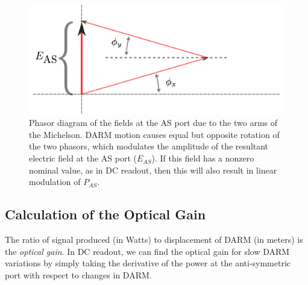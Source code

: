 \begin{figure}[p]
\includegraphics[width=\columnwidth]{figures/phasors.pdf}
\caption[Phasor diagram of DC readout]{\label{fig:mich-phasors}Phasor
  diagram of the fields at the AS port due to the two arms of the
  Michelson.  DARM motion causes equal but opposite rotation of the
  two phasors, which modulates the amplitude of the resultant electric
  field at the AS port ($E_{AS}$).  If this field has a nonzero
  nominal value, as in DC readout, then this will also result in
  linear modulation of $P_{AS}$.}
\end{figure}

\subsection{Calculation of the Optical Gain}

The ratio of signal produced (in Watts) to displacement of DARM (in
meters) is the \emph{optical gain}.  In DC readout, we can find the
optical gain for slow DARM variations by simply taking the derivative
of the power at the anti-symmetric port with respect to changes in
DARM.

